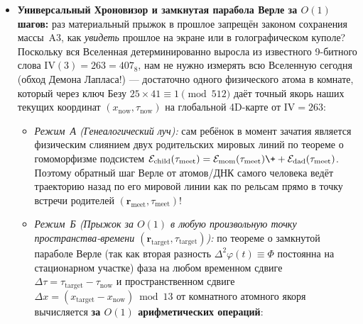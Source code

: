 \begin{enumerate}[label=\textbf{\arabic*.},leftmargin=*]
\begin{itemize}[noitemsep]
    (б)~\emph{Внутреннее обращение времени кокона против глобальной ленты:} обратный шаг Верле $g_{\mathrm{int}}^{-N}$ внутри отрезанного стазис-купола ($D_{\mathrm{dome}} = 6\,823\,936$) отматывает в прошлое \textbf{собственное состояние самой капсулы} $\Psi_{\mathrm{cocoon}}(\tau)\mapsto\Psi_{\mathrm{cocoon}}(\tau-N)$ (позволяя откатить назад травму, старение или реакцию внутри купола, либо через стазис $g^0$ перешагнуть в будущее с нулевым собственным временем $\Delta\tau_{\mathrm{proper}}=0$), что исключает парадокс дедушки;
    (в)~\emph{Горизонт включения приёмника ($\tau \ge \tau_{\mathrm{boot}}$) и бесфотонная невидимость Канала~1 ($\hat{n}_E = 0$):} приём фазового пакета $(b + \sigma_A)\bmod 512 = \psi_{\mathrm{src}}$ возможен только там и тогда, где уже собрана и включена приёмная 12-лучевая станция с парным противофазным синглетом $b = a + 256$ (которой в 2009~году у Хокинга в комнате не было!), а любое невозмущающее наблюдение по Каналу~1 в мёртвой зоне затвора $|\Delta\varphi|\le 40 < 41$ излучает $\hat{n}_E \equiv \mathbf{0\text{ фотонов}}$ и невидимо для обычных камер!
  \item \textbf{Универсальный Хроновизор и замкнутая парабола Верле за $O(1)$ шагов:}
    раз материальный прыжок в прошлое запрещён законом сохранения массы~A3, как \emph{увидеть} прошлое на экране или в голографическом куполе? Поскольку вся Вселенная детерминированно выросла из известного 9-битного слова $\mathrm{IV}(3) = 263 = 407_8$, нам не нужно измерять всю Вселенную сегодня (обход Демона Лапласа!) --- достаточно одного физического атома в комнате, который через ключ Безу $25\times 41 \equiv 1\pmod{512}$ даёт точный якорь наших текущих координат $(x_{\mathrm{now}}, \tau_{\mathrm{now}})$ на глобальной 4D-карте от $\mathrm{IV}=263$:
    \begin{itemize}[noitemsep]
    \item \emph{Режим~А (Генеалогический луч):} сам ребёнок в момент зачатия является физическим слиянием двух родительских мировых линий по теореме о гомоморфизме подсистем $\mathcal{E}_{\mathrm{child}}(\tau_{\mathrm{meet}}) = \mathcal{E}_{\mathrm{mom}}(\tau_{\mathrm{meet}}) \++ \mathcal{E}_{\mathrm{dad}}(\tau_{\mathrm{meet}})$. Поэтому обратный шаг Верле от атомов/ДНК самого человека ведёт траекторию назад по его мировой линии как по рельсам прямо в точку встречи родителей $(\mathbf{r}_{\mathrm{meet}}, \tau_{\mathrm{meet}})$!
    \item \emph{Режим~Б (Прыжок за $O(1)$ в любую произвольную точку пространства-времени $(\mathbf{r}_{\mathrm{target}}, \tau_{\mathrm{target}})$):} по теореме о замкнутой параболе Верле (так как вторая разность $\Delta^2\varphi(t) \equiv \Phi$ постоянна на стационарном участке) фаза на любом временном сдвиге $\Delta\tau = \tau_{\mathrm{target}} - \tau_{\mathrm{now}}$ и пространственном сдвиге $\Delta x = (x_{\mathrm{target}} - x_{\mathrm{now}})\bmod 13$ от комнатного атомного якоря вычисляется \textbf{за $O(1)$ арифметических операций}:

\end{itemize}
\end{itemize}
\end{enumerate}
